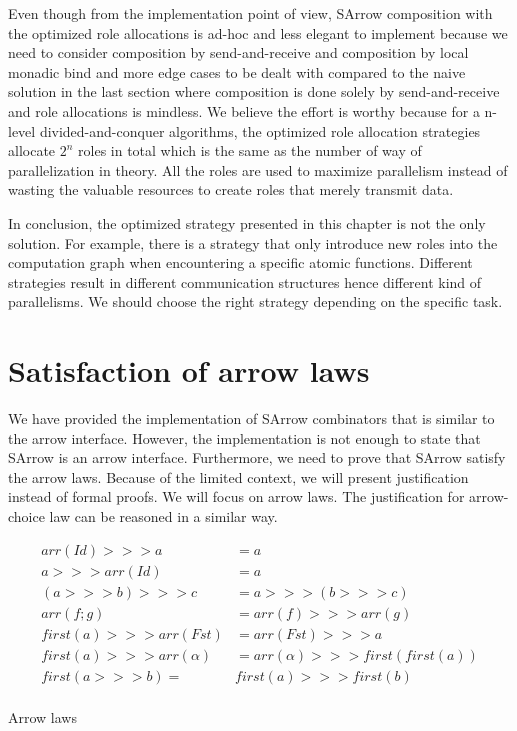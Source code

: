 Even though from the implementation point of view, SArrow composition with the optimized role allocations is ad-hoc and less elegant to implement because we need to consider composition by send-and-receive and composition by local monadic bind and more edge cases to be dealt with compared to the naive solution in the last section where composition is done solely by send-and-receive and role allocations is mindless. We believe the effort is worthy because for a n-level divided-and-conquer algorithms, the optimized role allocation strategies allocate $2^n$ roles in total which is the same as the number of way of parallelization in theory. All the roles are used to maximize parallelism instead of wasting the valuable resources to create roles that merely transmit data.

In conclusion, the optimized strategy presented in this chapter is not the only solution. For example, there is a strategy that only introduce new roles into the computation graph when encountering a specific atomic functions. Different strategies result in different communication structures hence different kind of parallelisms. We should choose the right strategy depending on the specific task.
\section{Satisfaction of arrow laws}
We have provided the implementation of SArrow combinators that is similar to the arrow interface. However, the implementation is not enough to state that SArrow is an arrow interface. Furthermore, we need to prove that SArrow satisfy the arrow laws. Because of the limited context, we will present justification instead of formal proofs. We will focus on arrow laws. The justification for arrow-choice law can be reasoned in a similar way.
\begin{table}[ht]
    \begin{align*}
        arr(Id) >>> a &= a \tag{1}\\
        a >>> arr(Id) &= a \tag{2}\\
        (a >>> b) >>> c &= a >>> (b >>> c) \tag{3}\\
        arr(f;g) &= arr(f) >>> arr(g) \tag{4}\\
        first(a) >>> arr(Fst) &= arr(Fst) >>> a \tag{5}\\
        first(a) >>> arr(\alpha) &= arr(\alpha) >>> first(first(a)) \tag{6}\\
        first(a >>> b) =& first(a) >>> first(b) \tag{7}\\
    \end{align*}
    \caption{Arrow laws \cite{atkeyWhatCategoricalModel2011}}
    \label{arrow:tab:law}
\end{table}

